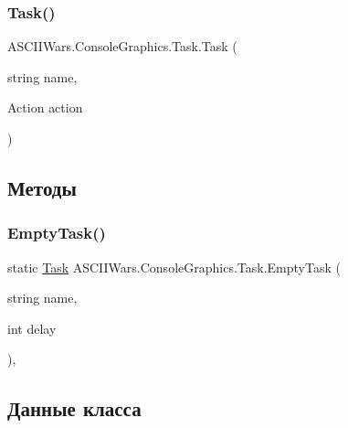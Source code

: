 \subsubsection{\texorpdfstring{Task()}{Task()}}
{\footnotesize\ttfamily A\+S\+C\+I\+I\+Wars.\+Console\+Graphics.\+Task.\+Task (\begin{DoxyParamCaption}\item[{string}]{name,  }\item[{Action}]{action }\end{DoxyParamCaption})\hspace{0.3cm}{\ttfamily [inline]}}



\subsection{Методы}
\hypertarget{class_a_s_c_i_i_wars_1_1_console_graphics_1_1_task_a199974d73498b9de5c95c3e90864a59b}{}\label{class_a_s_c_i_i_wars_1_1_console_graphics_1_1_task_a199974d73498b9de5c95c3e90864a59b} 
\subsubsection{\texorpdfstring{Empty\+Task()}{EmptyTask()}}
{\footnotesize\ttfamily static \hyperlink{class_a_s_c_i_i_wars_1_1_console_graphics_1_1_task}{Task} A\+S\+C\+I\+I\+Wars.\+Console\+Graphics.\+Task.\+Empty\+Task (\begin{DoxyParamCaption}\item[{string}]{name,  }\item[{int}]{delay }\end{DoxyParamCaption})\hspace{0.3cm}{\ttfamily [inline]}, {\ttfamily [static]}}



\subsection{Данные класса}
\hypertarget{class_a_s_c_i_i_wars_1_1_console_graphics_1_1_task_a9fcf12d48e7ae10b20db0828cedf4f7d}{}\label{class_a_s_c_i_i_wars_1_1_console_graphics_1_1_task_a9fcf12d48e7ae10b20db0828cedf4f7d} 

